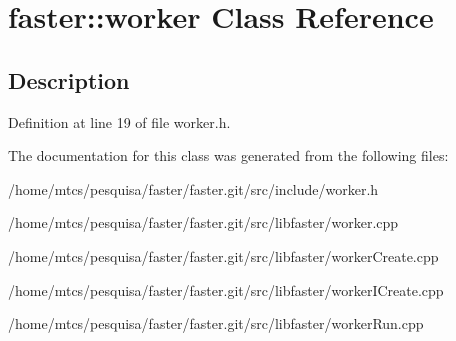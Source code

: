 \hypertarget{classfaster_1_1worker}{}\section{faster\+:\+:worker Class Reference}
\label{classfaster_1_1worker}


\subsection{Description}


Definition at line 19 of file worker.\+h.



The documentation for this class was generated from the following files\+:\begin{DoxyCompactItemize}
\item 
/home/mtcs/pesquisa/faster/faster.\+git/src/include/worker.\+h\item 
/home/mtcs/pesquisa/faster/faster.\+git/src/libfaster/worker.\+cpp\item 
/home/mtcs/pesquisa/faster/faster.\+git/src/libfaster/worker\+Create.\+cpp\item 
/home/mtcs/pesquisa/faster/faster.\+git/src/libfaster/worker\+I\+Create.\+cpp\item 
/home/mtcs/pesquisa/faster/faster.\+git/src/libfaster/worker\+Run.\+cpp\end{DoxyCompactItemize}

